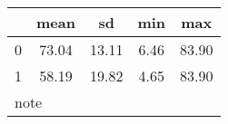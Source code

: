 \begin{tabular}{l*{1}{cccc}}
\toprule
            &        mean&          sd&         min&         max\\
\midrule
0           &       73.04&       13.11&        6.46&       83.90\\
1           &       58.19&       19.82&        4.65&       83.90\\
\bottomrule
\multicolumn{5}{l}{\footnotesize note}\\
\end{tabular}
